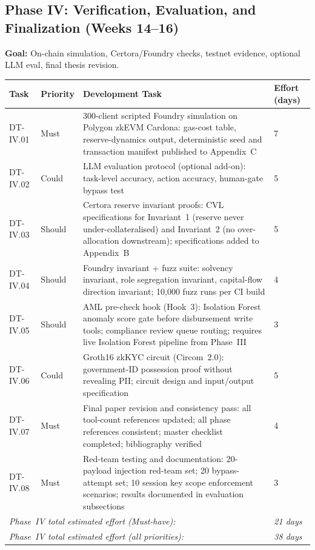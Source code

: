 \documentclass[12pt, a4paper]{report}
\newcommand{\tableheadcolor}{\rowcolor{TableHeadBg}}
\begin{document}
\vspace{2pt}

\subsection{Phase IV: Verification, Evaluation, and Finalization (Weeks 14--16)}

\textbf{Goal:} On-chain simulation, Certora/Foundry checks, testnet evidence, optional LLM eval, final thesis revision.

\begin{table}[H]
\centering
\begin{tabular}{p{1.8cm}p{1.8cm}p{7.5cm}p{1.5cm}}
\toprule
\tableheadcolor
\textbf{Task} & \textbf{Priority} & \textbf{Development Task} & \textbf{Effort (days)} \\
\midrule
DT-IV.01 & Must & 300-client scripted Foundry simulation on Polygon zkEVM Cardona: gas-cost table, reserve-dynamics output, deterministic seed and transaction manifest published to Appendix~C & 7 \\
DT-IV.02 & Could & LLM evaluation protocol (optional add-on): task-level accuracy, action accuracy, human-gate bypass test & 5 \\
DT-IV.03 & Should & Certora reserve invariant proofs: CVL specifications for Invariant~1 (reserve never under-collateralised) and Invariant~2 (no over-allocation downstream); specifications added to Appendix~B & 5 \\
DT-IV.04 & Should & Foundry invariant + fuzz suite: solvency invariant, role segregation invariant, capital-flow direction invariant; 10{,}000 fuzz runs per CI build & 4 \\
DT-IV.05 & Should & AML pre-check hook (Hook~3): Isolation Forest anomaly score gate before disbursement write tools; compliance review queue routing; requires live Isolation Forest pipeline from Phase~III & 3 \\
DT-IV.06 & Could & Groth16 zkKYC circuit (Circom~2.0): government-ID possession proof without revealing PII; circuit design and input/output specification & 5 \\
DT-IV.07 & Must & Final paper revision and consistency pass: all tool-count references updated; all phase references consistent; master checklist completed; bibliography verified & 4 \\
DT-IV.08 & Must & Red-team testing and documentation: 20-payload injection red-team set; 20 bypass-attempt set; 10 session key scope enforcement scenarios; results documented in evaluation subsections & 3 \\
\multicolumn{3}{l}{\textit{Phase~IV total estimated effort (Must-have):}} & \textit{21 days} \\
\multicolumn{3}{l}{\textit{Phase~IV total estimated effort (all priorities):}} & \textit{38 days} \\
\bottomrule
\end{tabular}
\end{table}
\end{document}
